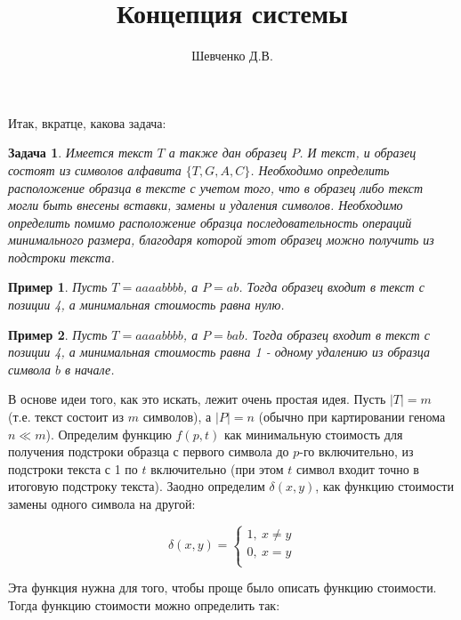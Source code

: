 \documentclass[11pt,a4paper,oneside]{article}
\begin{document}
\newtheorem{example}{Пример}
\newtheorem{task}{Задача}
\newtheorem{heuristic}{Эвристика}
\title{Концепция системы}
\author{Шевченко Д.В.}

\maketitle

Итак, вкратце, какова задача:

\begin{task}
Имеется текст $T$ а также дан образец $P$. И текст, и образец состоят из символов алфавита $\{T,G,A,C\}$. Необходимо определить расположение образца в тексте с учетом того, что в образец либо текст могли быть внесены вставки, замены и удаления символов. Необходимо определить помимо расположение образца последовательность операций минимального размера, благодаря которой этот образец можно получить из подстроки текста.
\end{task}

\begin{example}
	Пусть $T=aaaabbbb$, а $P=ab$. Тогда образец входит в текст с позиции 4, а минимальная стоимость равна нулю.
\end{example}

\begin{example}
	Пусть $T=aaaabbbb$, а $P=bab$. Тогда образец входит в текст с позиции 4, а минимальная стоимость равна 1 - одному удалению из образца символа $b$ в начале.
\end{example}

В основе идеи того, как это искать, лежит очень простая идея. Пусть $|T|=m$ (т.е. текст состоит из $m$ символов), а $|P|=n$ (обычно при картировании генома $n\ll m$). Определим функцию $f(p,t)$ как минимальную стоимость для получения подстроки образца с первого символа до $p$-го включительно, из подстроки текста с 1 по $t$ включительно (при этом $t$ символ входит точно в итоговую подстроку текста). Заодно определим $\delta(x,y)$, как функцию стоимости замены одного символа на другой:

\begin{equation}
	\delta(x,y) = \begin{cases}
	1,\ x\neq y\\
	0,\ x = y\\
	\end{cases}
\end{equation}

Эта функция нужна для того, чтобы проще было описать функцию стоимости. Тогда функцию стоимости можно определить так:
\end{document}
